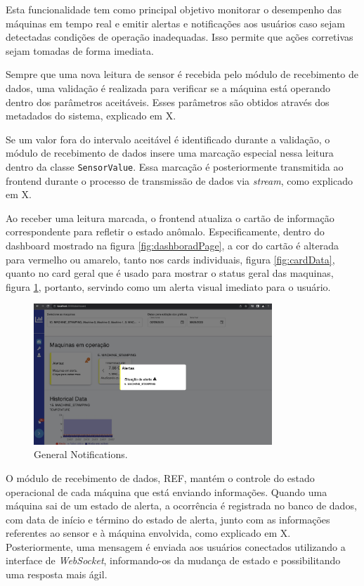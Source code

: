 Esta funcionalidade tem como principal objetivo monitorar o desempenho das máquinas em tempo real e emitir alertas e notificações aos usuários caso sejam detectadas condições de operação inadequadas. Isso permite que ações corretivas sejam tomadas de forma imediata.

Sempre que uma nova leitura de sensor é recebida pelo módulo de recebimento de dados, uma validação é realizada para verificar se a máquina está operando dentro dos parâmetros aceitáveis. Esses parâmetros são obtidos através dos metadados do sistema, explicado em X.

Se um valor fora do intervalo aceitável é identificado durante a validação, o módulo de recebimento de dados insere uma marcação especial nessa leitura dentro da classe \texttt{SensorValue}. Essa marcação é posteriormente transmitida ao frontend durante o processo de transmissão de dados via \textit{stream}, como explicado em X. %

Ao receber uma leitura marcada, o frontend atualiza o cartão de informação correspondente para refletir o estado anômalo. Especificamente, dentro do dashboard mostrado na figura \ref{fig:dashboradPage}, a cor do cartão é alterada para vermelho ou amarelo, tanto nos cards individuais, figura \ref{fig:cardData}, quanto no card geral que é usado para mostrar o status geral das maquinas, figura \ref{fig:geralMachineAlert}, portanto, servindo como um alerta visual imediato para o usuário. 

\begin{figure}[htbp]
	\centering
	\includegraphics[width=0.8\textwidth]{images/geralMachineAlert.png}
	\caption{General Notifications.}
	\label{fig:geralMachineAlert}
\end{figure}

O módulo de recebimento de dados, REF, mantém o controle do estado operacional de cada máquina que está enviando informações. Quando uma máquina sai de um estado de alerta, a ocorrência é registrada no banco de dados, com data de início e término do estado de alerta, junto com as informações referentes ao sensor e à máquina envolvida, como explicado em X. Posteriormente, uma mensagem é enviada aos usuários conectados utilizando a interface de \textit{WebSocket}, informando-os da mudança de estado e possibilitando uma resposta mais ágil. %

